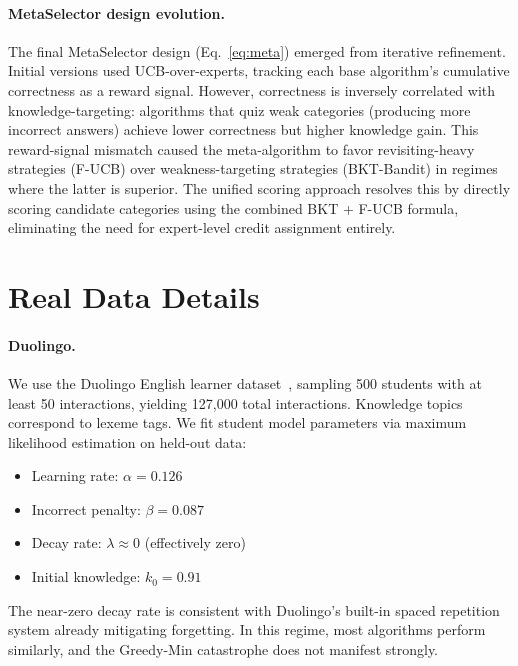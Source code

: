 \paragraph{MetaSelector design evolution.}
The final MetaSelector design (Eq.~\ref{eq:meta}) emerged from iterative refinement.
Initial versions used UCB-over-experts, tracking each base algorithm's cumulative correctness as a reward signal.
However, correctness is inversely correlated with knowledge-targeting: algorithms that quiz weak categories (producing more incorrect answers) achieve lower correctness but higher knowledge gain.
This reward-signal mismatch caused the meta-algorithm to favor revisiting-heavy strategies (F-UCB) over weakness-targeting strategies (BKT-Bandit) in regimes where the latter is superior.
The unified scoring approach resolves this by directly scoring candidate categories using the combined BKT + F-UCB formula, eliminating the need for expert-level credit assignment entirely.

\section{Real Data Details}
\label{app:realdata}

\paragraph{Duolingo.}
We use the Duolingo English learner dataset~\citep{settles2016trainable}, sampling 500 students with at least 50 interactions, yielding 127{,}000 total interactions.
Knowledge topics correspond to lexeme tags.
We fit student model parameters via maximum likelihood estimation on held-out data:
\begin{itemize}[leftmargin=*,itemsep=1pt]
    \item Learning rate: $\alpha = 0.126$
    \item Incorrect penalty: $\beta = 0.087$
    \item Decay rate: $\lambda \approx 0$ (effectively zero)
    \item Initial knowledge: $k_0 = 0.91$
\end{itemize}
The near-zero decay rate is consistent with Duolingo's built-in spaced repetition system already mitigating forgetting.
In this regime, most algorithms perform similarly, and the Greedy-Min catastrophe does not manifest strongly.

